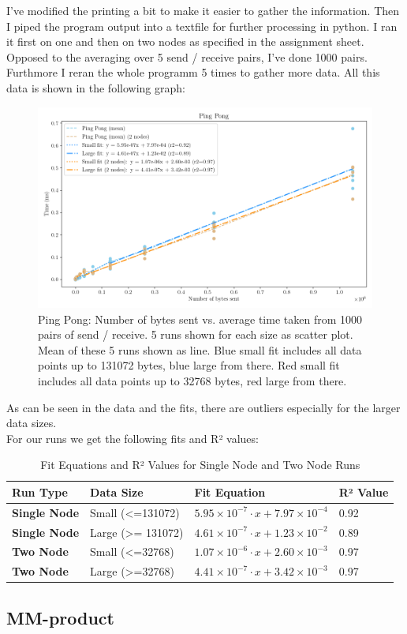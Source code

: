 I've modified the printing a bit to make it easier to gather the information. 
Then I piped the program output into a textfile for further processing in python. I ran it first on one and then on two nodes as specified in the assignment sheet. Opposed to the averaging over 5 send / receive pairs, I've done 1000 pairs. Furthmore I reran the whole programm 5 times to gather more data. 
All this data is shown in the following graph: 
\begin{figure}[H]
    \centering
    \includegraphics[width=\textwidth]{../fig/lab0/pingPong.png}
    \caption{Ping Pong: Number of bytes sent vs. average time taken from 1000 pairs of send / receive. 5 runs shown for each size as scatter plot. Mean of these 5 runs shown as line. Blue small fit includes all data points up to 131072 bytes, blue large from there. Red small fit includes all data points up to 32768 bytes, red large from there.}
    \label{fig:pingpong}
\end{figure}
As can be seen in the data and the fits, there are outliers especially for the larger data sizes. \\
For our runs we get the following fits and R² values:
\begin{table}[h!]
    \centering
    \begin{tabular}{|l|l|l|l|}
        \hline
        \textbf{Run Type}   & \textbf{Data Size} & \textbf{Fit Equation}                                      & \textbf{R² Value} \\ \hline
        \textbf{Single Node} & Small (<=131072)             & $5.95 \times 10^{-7} \cdot x + 7.97 \times 10^{-4}$        & 0.92              \\ \hline
        \textbf{Single Node} & Large (>= 131072)& $4.61 \times 10^{-7} \cdot x + 1.23 \times 10^{-2}$        & 0.89              \\ \hline
        \textbf{Two Node}    & Small (<=32768)& $1.07 \times 10^{-6} \cdot x + 2.60 \times 10^{-3}$        & 0.97              \\ \hline
        \textbf{Two Node}    & Large (>=32768)   & $4.41 \times 10^{-7} \cdot x + 3.42 \times 10^{-3}$        & 0.97              \\ \hline
    \end{tabular}
    \caption{Fit Equations and R² Values for Single Node and Two Node Runs}
\end{table}

\subsection{MM-product}





